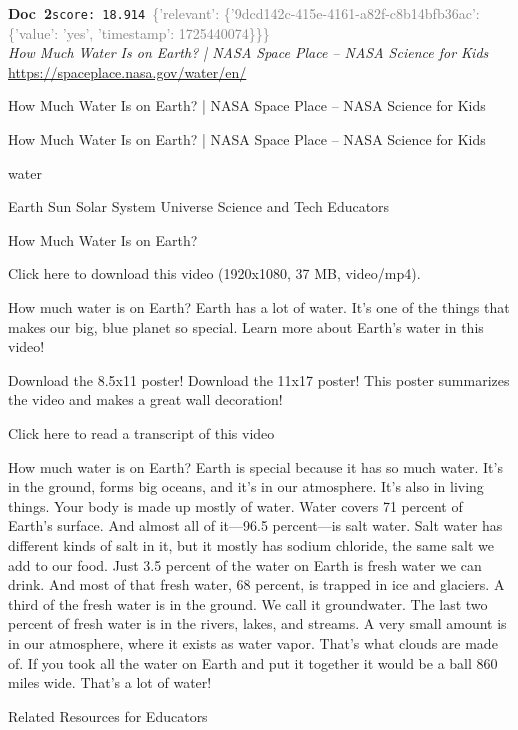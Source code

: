 \documentclass[a4paper,11pt]{article}
\begin{document}
\begin{docenv}
{\footnotesize\textcolor{doccolor}{\textbf{Doc~2}}}\hfill{\tiny\texttt{score:~18.914}}\ {\tiny\textcolor{gray}{\{'relevant': \{'9dcd142c-415e-4161-a82f-c8b14bfb36ac': \{'value': 'yes', 'timestamp': 1725440074\}\}\}}}\\[3pt]
{\small\textit{How Much Water Is on Earth? | NASA Space Place – NASA Science for Kids}}\\[2pt]
{\tiny\url{https://spaceplace.nasa.gov/water/en/}}\\[4pt]
{\footnotesize How Much Water Is on Earth? | NASA Space Place – NASA Science for Kids


How Much Water Is on Earth? | NASA Space Place – NASA Science for Kids

water

Earth
Sun
Solar System
Universe
Science and Tech
Educators

How Much Water Is on Earth?

Click here to download this video (1920x1080, 37 MB, video/mp4).

How much water is on Earth?
Earth has a lot of water. It's one of the things that makes our big, blue planet so special. Learn more about Earth's water in this video! 

 Download the 8.5x11 poster!
 Download the 11x17 poster!
This poster summarizes the video and makes a great wall decoration!

 Click here to read a transcript of this video

How much water is on Earth?
Earth is special because it has so much water. It’s in the ground, forms big oceans, and it’s in our atmosphere.
It’s also in living things. Your body is made up mostly of water.
Water covers 71 percent of Earth’s surface. And almost all of it—96.5 percent—is salt water. 
Salt water has different kinds of salt in it, but it mostly has sodium chloride, the same salt we add to our food.
Just 3.5 percent of the water on Earth is fresh water we can drink. And most of that fresh water, 68 percent, is trapped in ice and glaciers.
A third of the fresh water is in the ground. We call it groundwater. The last two percent of fresh water is in the rivers, lakes, and streams.
A very small amount is in our atmosphere, where it exists as water vapor. That’s what clouds are made of.
If you took all the water on Earth and put it together it would be a ball 860 miles wide. That’s a lot of water!

Related Resources for Educators

}
\end{docenv}
\end{document}
